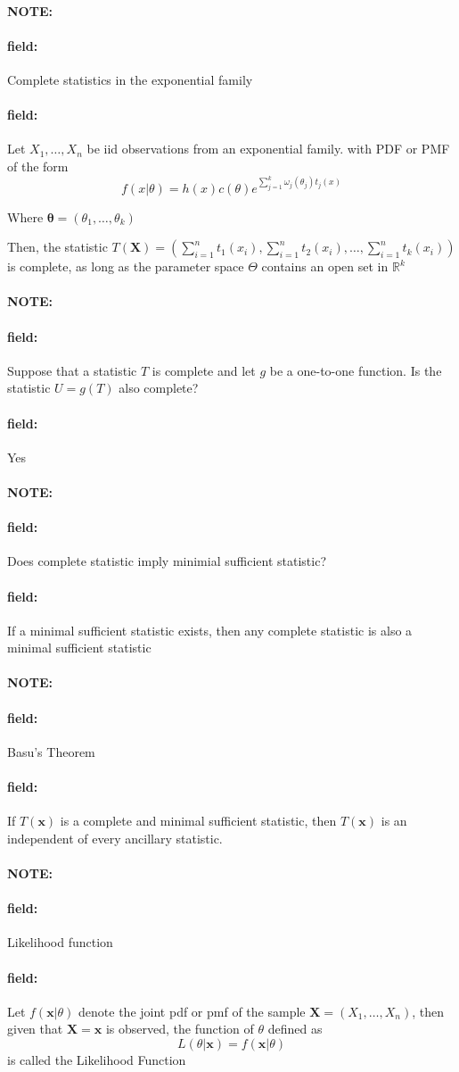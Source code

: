 \documentclass[12pt]{article}
\newenvironment{note}{\paragraph{NOTE:}}{}
\newenvironment{field}{\paragraph{field:}}{}
\begin{document}
\begin{note}
  \begin{field}
    Complete statistics in the exponential family
  \end{field}
  \begin{field}
    Let $X_1, \ldots , X_n$ be iid observations from an exponential family. with PDF or PMF of the form
    $$ f(x|\theta) = h(x)c(\theta)e^{\sum_{j=1}^k \omega_j(\theta_j)t_j(x)}$$

    Where $\boldsymbol\theta = (\theta_1, \ldots , \theta_k)$

    Then, the statistic $T(\mathbf{X}) = (\sum_{i=1}^n t_1(x_i), \sum _{i = 1}^n t_2(x_i), \ldots , \sum _{i = 1}^n t_k(x_i))$ is complete, as long as the parameter space $\Theta$ contains an open set in $\mathbb{R}^k$
  \end{field}
\end{note}

\begin{note}
  \begin{field}
    Suppose that a statistic $T$ is complete and let $g$ be a one-to-one function. Is the statistic $U = g(T)$ also complete?
  \end{field}
  \begin{field}
    Yes
  \end{field}
\end{note}

\begin{note}
  \begin{field}
    Does complete statistic imply minimial sufficient statistic?
  \end{field}
  \begin{field}
    If a minimal sufficient statistic exists, then any complete statistic is also a minimal sufficient statistic
  \end{field}
\end{note}

\begin{note}
  \begin{field}
    Basu's Theorem
  \end{field}
  \begin{field}
    If $T(\mathbf{x})$ is a complete and minimal sufficient statistic, then $T(\mathbf{x})$ is an independent of every ancillary statistic.
  \end{field}
\end{note}

\begin{note}
  \begin{field}
    Likelihood function
  \end{field}
  \begin{field}
    Let $f(\mathbf{x}|\theta)$ denote the joint pdf or pmf of the sample $\mathbf{X} = (X_1, \ldots , X_n)$, then given that $\mathbf{X} = \mathbf{x}$ is observed, the function of $\theta$ defined as $$L(\theta|\mathbf{x}) = f(\mathbf{x}|\theta)$$
    is called the Likelihood Function
  \end{field}
\end{note}
\end{document}
